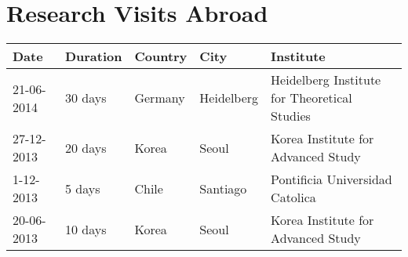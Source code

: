 \documentclass{report}
\begin{document}
\section*{Research Visits Abroad}

\begin{tabular}{p{2.0cm} p{1.5cm} p{1.5cm} p{1.5cm} p{5.5cm}}\hline
Date & Duration & Country & City & Institute\\\hline
21-06-2014 & 30 days & Germany & Heidelberg & Heidelberg Institute for Theoretical Studies \\
27-12-2013 & 20 days & Korea & Seoul & Korea Institute for Advanced Study\\
1-12-2013 & 5 days & Chile & Santiago & Pontificia Universidad Catolica\\
20-06-2013 & 10 days & Korea & Seoul & Korea Institute for Advanced Study
\end{tabular}
\end{document}
